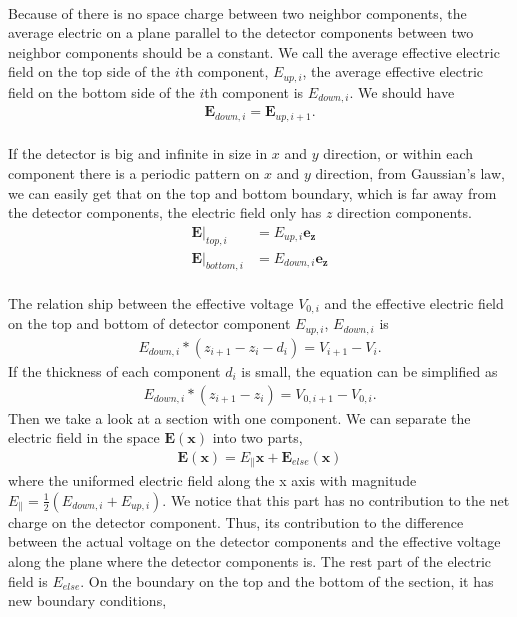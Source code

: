 \\
Because of there is no space charge between two neighbor components, the average electric on a plane parallel to the detector components between two neighbor components should be a constant. We call the average effective electric field on the top side of the $i$th component, $E_{up,i}$, the average effective electric field on the bottom side of the $i$th component is $E_{down,i}$. We should have
\begin{align}
\boldsymbol{E}_{down, i}= \boldsymbol{E}_{up, i+1}.
\end{align}
\\
If the detector is big and infinite in size in $x$ and $y$ direction, or within each component there is a periodic pattern on $x$ and $y$ direction, from Gaussian's law, we can easily get that on the top and bottom boundary, which is far away from the detector components, the electric field only has $z$ direction components. 
\begin{align}
\boldsymbol{E}|_{top, i} & = E_{up, i} \boldsymbol{e_z}\\
\boldsymbol{E}|_{bottom, i} & = E_{down, i} \boldsymbol{e_z}
\end{align}
\\
The relation ship between the effective voltage $V_{0,i}$ and the effective electric field on the top and bottom of detector component $E_{up,i}$, $E_{down,i}$ is 
\begin{align}
E_{down, i}* (z_{i+1}-z_{i}-d_{i}) = V_{i+1}-V_{i}.
\end{align}
If the thickness of each component $d_i$ is small, the equation can be simplified as
\begin{align}
E_{down, i}* (z_{i+1}-z_{i}) = V_{0,i+1}-V_{0,i}.
\end{align}
Then we take a look at a section with one component. We can separate the electric field in the space $\boldsymbol{E}(\boldsymbol{x})$ into two parts,  
\begin{align}
\boldsymbol{E}(\boldsymbol{x}) = E_{\parallel} \boldsymbol{x} + \boldsymbol{E}_{else}(\boldsymbol{x})
\end{align}
where the uniformed electric field along the x axis with magnitude $E_{\parallel}=\frac{1}{2}(E_{down, i} + E_{up, i})$. We notice that this part has no contribution to the net charge on the detector component. Thus, its contribution to the difference between the actual voltage on the detector components and the effective voltage along the plane where the detector components is. The rest part of the electric field is $E_{else}$. On the boundary on the top and the bottom of the section, it has new boundary conditions, 
